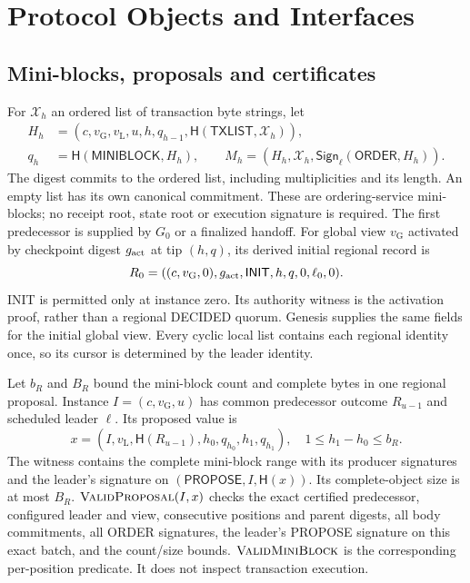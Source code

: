 \documentclass[11pt,a4paper,onecolumn]{article}
\newcommand{\Hash}{\mathsf H}
\newcommand{\Sig}{\mathsf{Sign}}
\newcommand{\gv}{v_{\mathrm G}}
\newcommand{\lv}{v_{\mathrm L}}
\newcommand{\Tag}[1]{\mathsf{#1}}
\newcommand{\Proc}[1]{\textnormal{\textsc{#1}}}
\theoremstyle{remark}\newtheorem{example}[definition]{Example}
\begin{document}
\section{Protocol Objects and Interfaces}\label{sec:objects}
\subsection{Mini-blocks, proposals and certificates}
For $\mathcal X_h$ an ordered list of transaction byte strings, let
\begin{align}
 H_h&=(c,\gv,\lv,u,h,q_{h-1},\Hash(\Tag{TXLIST},\mathcal X_h)),\label{eq:block}\\
 q_h&=\Hash(\Tag{MINIBLOCK},H_h),\qquad
 M_h=(H_h,\mathcal X_h,\Sig_\ell(\Tag{ORDER},H_h)).\nonumber
\end{align}
The digest commits to the ordered list, including multiplicities and its length.
An empty list has its own canonical commitment. These are ordering-service
mini-blocks; no receipt root, state root or execution signature is required.
The first predecessor is supplied by $G_0$ or a finalized handoff.
For global view $\gv$ activated by checkpoint digest $g_{\rm act}$ at tip $(h,q)$,
its derived initial regional record is
\[
 R_0=((c,\gv,0),g_{\rm act},\Tag{INIT},h,q,0,\ell_0,0).
\]
INIT is permitted only at instance zero. Its authority witness is the activation
proof, rather than a regional DECIDED quorum. Genesis supplies the same fields
for the initial global view. Every cyclic local list contains each regional
identity once, so its cursor is determined by the leader identity.

Let $b_R$ and $B_R$ bound the mini-block count and complete bytes in one
regional proposal. Instance $I=(c,\gv,u)$ has common predecessor outcome
$R_{u-1}$ and scheduled leader $\ell$. Its proposed value is
\begin{equation}\label{eq:proposal}
 x=(I,\lv,\Hash(R_{u-1}),h_0,q_{h_0},h_1,q_{h_1}),\quad
 1\leq h_1-h_0\leq b_R.
\end{equation}
The witness contains the complete mini-block range with its producer signatures
and the leader's signature on $(\Tag{PROPOSE},I,\Hash(x))$.
Its complete-object size is at most $B_R$.
$\Proc{ValidProposal}(I,x)$ checks the exact certified predecessor, configured
leader and view, consecutive positions and parent digests, all body commitments,
all ORDER signatures, the leader's PROPOSE signature on this exact batch,
and the count/size bounds. $\Proc{ValidMiniBlock}$ is the
corresponding per-position predicate. It does not inspect transaction execution.
\end{document}
